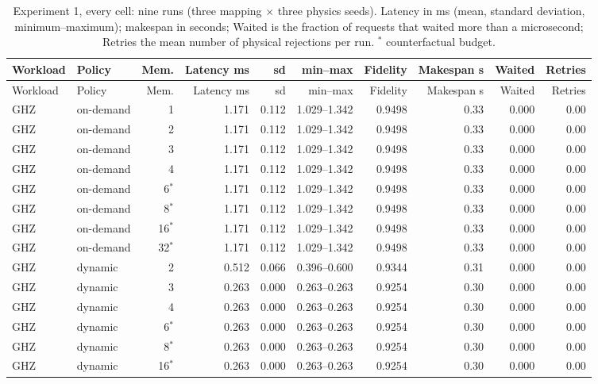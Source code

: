 {\scriptsize\setlength{\tabcolsep}{2.4pt}
\begin{longtable}{@{}llrrrrrrrr@{}}
\caption{Experiment 1, every cell: nine runs (three mapping $\times$ three physics seeds). Latency in ms (mean, standard deviation, minimum--maximum); makespan in seconds; Waited is the fraction of requests that waited more than a microsecond; Retries the mean number of physical rejections per run. $^*$ counterfactual budget.}\label{tab:exp1-full}\\
\toprule
Workload & Policy & Mem. & Latency ms & sd & min--max & Fidelity & Makespan s & Waited & Retries \\
\midrule
\endfirsthead
\toprule
Workload & Policy & Mem. & Latency ms & sd & min--max & Fidelity & Makespan s & Waited & Retries \\
\midrule
\endhead
\bottomrule
\endfoot
GHZ & on-demand & 1 & 1.171 & 0.112 & 1.029--1.342 & 0.9498 & 0.33 & 0.000 & 0.00 \\
GHZ & on-demand & 2 & 1.171 & 0.112 & 1.029--1.342 & 0.9498 & 0.33 & 0.000 & 0.00 \\
GHZ & on-demand & 3 & 1.171 & 0.112 & 1.029--1.342 & 0.9498 & 0.33 & 0.000 & 0.00 \\
GHZ & on-demand & 4 & 1.171 & 0.112 & 1.029--1.342 & 0.9498 & 0.33 & 0.000 & 0.00 \\
GHZ & on-demand & 6$^*$ & 1.171 & 0.112 & 1.029--1.342 & 0.9498 & 0.33 & 0.000 & 0.00 \\
GHZ & on-demand & 8$^*$ & 1.171 & 0.112 & 1.029--1.342 & 0.9498 & 0.33 & 0.000 & 0.00 \\
GHZ & on-demand & 16$^*$ & 1.171 & 0.112 & 1.029--1.342 & 0.9498 & 0.33 & 0.000 & 0.00 \\
GHZ & on-demand & 32$^*$ & 1.171 & 0.112 & 1.029--1.342 & 0.9498 & 0.33 & 0.000 & 0.00 \\
GHZ & dynamic & 2 & 0.512 & 0.066 & 0.396--0.600 & 0.9344 & 0.31 & 0.000 & 0.00 \\
GHZ & dynamic & 3 & 0.263 & 0.000 & 0.263--0.263 & 0.9254 & 0.30 & 0.000 & 0.00 \\
GHZ & dynamic & 4 & 0.263 & 0.000 & 0.263--0.263 & 0.9254 & 0.30 & 0.000 & 0.00 \\
GHZ & dynamic & 6$^*$ & 0.263 & 0.000 & 0.263--0.263 & 0.9254 & 0.30 & 0.000 & 0.00 \\
GHZ & dynamic & 8$^*$ & 0.263 & 0.000 & 0.263--0.263 & 0.9254 & 0.30 & 0.000 & 0.00 \\
GHZ & dynamic & 16$^*$ & 0.263 & 0.000 & 0.263--0.263 & 0.9254 & 0.30 & 0.000 & 0.00 \\

\end{longtable}}
